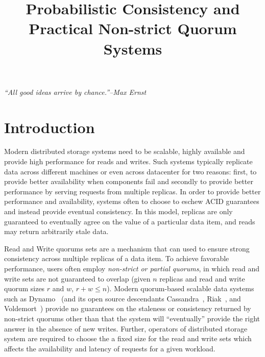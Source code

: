 \documentclass{vldb}
\title{Probabilistic Consistency and\\ Practical Non-strict Quorum Systems}
\begin{document}
\maketitle

\noindent\textit{``All good ideas arrive by chance.''--Max Ernst}



\section{Introduction}

Modern distributed storage systems need to be scalable, highly 
available and provide high performance for reads and writes.
Such systems typically replicate data across different machines
or even across datacenter for two reasons: first, to provide 
better availability when components fail and secondly to provide 
better performance by serving requests from multiple replicas.
In order to provide better performance and availability, systems
often to choose to eschew ACID guarantees and instead provide 
eventual consistency. In this model, replicas are only guaranteed 
to eventually agree on the value of a particular data item, and 
reads may return arbitrarily stale data.

Read and Write quorums sets are a mechanism that can used to ensure 
strong consistency across multiple replicas of a data item. To 
achieve favorable performance, users often employ 
\textit{non-strict or partial quorums}, in which
read and write sets are not guaranteed to overlap (given $n$ replicas
and read and write quorum sizes $r$ and $w$, $r+w \leq n$).  Modern
quorum-based scalable data systems such as Dynamo~\cite{dynamo} (and
its open source descendants Cassandra~\cite{cassandra},
Riak~\cite{riak}, and Voldemort~\cite{voldemort}) provide no
guarantees on the staleness or consistency returned by non-strict
quorums other than that the system will ``eventually'' provide the
right answer in the absence of new writes. Further, operators of 
distributed storage system are required to choose the a fixed 
size for the read and write sets which affects the availability 
and latency of requests for a given workload.
\end{document}

